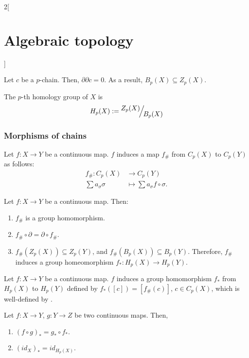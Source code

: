 \documentclass[../../../main_math.tex]{subfiles}
\begin{document}
\begin{multicols}{2}[\section{Algebraic topology}]
  \begin{lemma}
    Let $c$ be a $p$-chain. Then, $\partial \partial c=0$. As a result, $B_p(X)\subseteq Z_p(X)$.
  \end{lemma}

  \begin{definition}
    The $p$-th homology group of $X$ is $$H_p(X):=\quot{Z_p(X)}{B_p(X)}$$
  \end{definition}

  \subsubsection{Morphisms of chains}

  \begin{definition}
    Let $f: X \to Y$ be a continuous map. $f$ induces a map $f_{\#}$ from $C_p(X)$ to $C_p(Y)$ as follows:
    \begin{align*}
      f_{\#}: C_p(X)         & \longrightarrow C_p(Y)                    \\
      \sum a_{\sigma} \sigma & \longmapsto \sum a_{\sigma} f\circ\sigma.
    \end{align*}

  \end{definition}

  \begin{proposition}\label{TAApInduida}
    Let $f:X\to Y$ be a continuous map. Then:
    \begin{enumerate}
      \item $f_{\#}$ is a group homomorphism.
      \item $f_{\#}\circ \partial= \partial \circ f_{\#}$.
      \item $f_{\#}(Z_p(X))\subseteq Z_p(Y)$, and $f_{\#}(B_p(X))\subseteq B_p(Y)$. Therefore, $f_{\#}$ induces a group homeomorphism $f_{*}: H_p(X) \to H_p(Y)$.
    \end{enumerate}
  \end{proposition}

  \begin{definition}
    Let $f: X \to Y$ be a continuous map. $f$ induces a group homomorphism $f_{*}$ from $H_p(X)$ to $H_p(Y)$ defined by $f_{*}([c])=[f_{\#}(c)]$, $c\in C_p(X)$, which is well-defined by .
  \end{definition}

  \begin{proposition}
    Let $f:X\to Y$, $g:Y\to Z$ be two continuous maps. Then,
    \begin{enumerate}
      \item $(f\circ g)_{*}=g_{*}\circ f_{*}$.
      \item $(id_{X})_*=id_{H_p(X)}$.
    \end{enumerate}
  \end{proposition}


\end{multicols}
\end{document}
